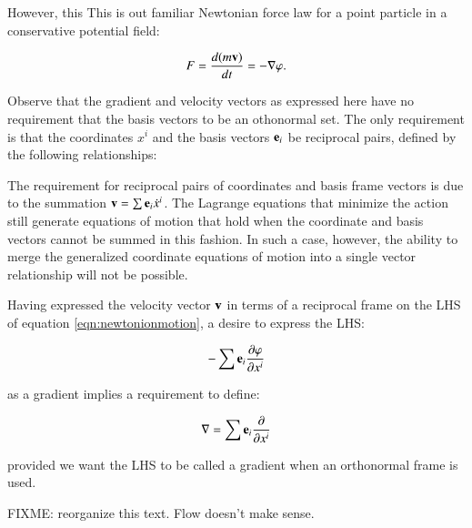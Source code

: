 \documentclass{article}
\newcommand{\grad}[0]{\nabla}
\newcommand{\PD}[2]{ \frac{\partial{#1}}{\partial {#2}} }
\begin{document}
However, this 
This is out familiar Newtonian force law for a point particle in a conservative potential field:

\begin{equation}\label{eqn:newtonionmotion}
F = \frac{d (m \Bv)}{dt} = -\grad \varphi.
\end{equation}

Observe that the gradient and velocity vectors as expressed here have no requirement that the basis vectors to be an
othonormal set.  The only requirement is that the coordinates $x^i$ and the basis vectors $\mathbf{e}_i$ be reciprocal pairs, defined by the following relationships:


The requirement for reciprocal pairs of coordinates and basis frame vectors is due to the 
summation $\mathbf{v} = \sum \mathbf{e}_i \dot{x}^i$.  The Lagrange equations that minimize the action still generate equations of
motion that hold when the coordinate and basis vectors cannot be summed in this fashion.
In such a case, however, the ability to merge the generalized coordinate equations of motion into a single
vector relationship will not be possible.

Having expressed the velocity vector $\mathbf{v}$ in terms of a
reciprocal frame on the LHS of equation \ref{eqn:newtonionmotion}, a 
desire to express the LHS:

\begin{equation*}
-\sum \Be_i \PD{\varphi}{x^i}
\end{equation*}

as a gradient implies a requirement to define:

\begin{equation}
\grad = \sum \Be_i \PD{}{x^i}
\end{equation}

provided we want the LHS to be called a gradient when an orthonormal frame
is used.

FIXME: reorganize this text.  Flow doesn't make sense.
\end{document}
